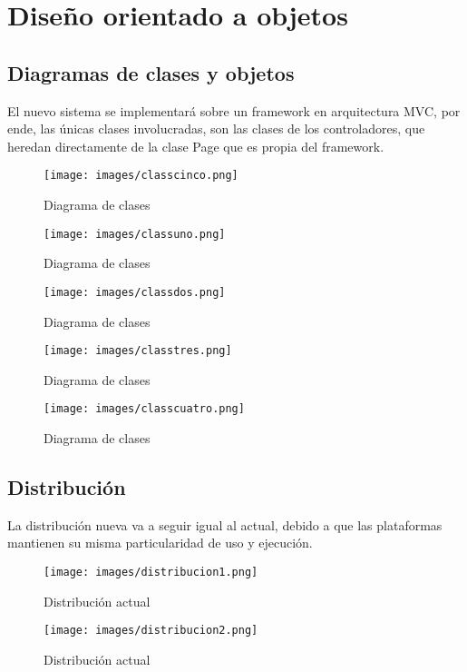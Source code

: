 \chapter{Dise\~no orientado a objetos}
\section{Diagramas de clases y objetos}
El nuevo sistema se implementar\'a sobre un framework en arquitectura MVC, por ende, las \'unicas clases involucradas, son las clases de los controladores, que heredan directamente de la clase Page que es propia del framework.%
%
\begin{figure}[htbp]
	\centering
		\texttt{[image: images/classcinco.png]}
	\caption{Diagrama de clases}
	\label{fig:classcinco}
\end{figure}%
%
\begin{figure}[htbp]
	\centering
		\texttt{[image: images/classuno.png]}
	\caption{Diagrama de clases}
	\label{fig:classuno}
\end{figure}%
%
\begin{figure}[htbp]
	\centering
		\texttt{[image: images/classdos.png]}
	\caption{Diagrama de clases}
	\label{fig:classdos}
\end{figure}%
%
\begin{figure}[htbp]
	\centering
		\texttt{[image: images/classtres.png]}
	\caption{Diagrama de clases}
	\label{fig:classtres}
\end{figure}%
%
\begin{figure}[htbp]
	\centering
		\texttt{[image: images/classcuatro.png]}
	\caption{Diagrama de clases}
	\label{fig:classcuatro}
\end{figure}%
\newpage%
\section{Distribuci\'on}
La distribuci\'on nueva va a seguir igual al actual, debido a que las plataformas mantienen su misma particularidad de uso y ejecuci\'on.%
\begin{figure}[htbp]
	\centering
		\texttt{[image: images/distribucion1.png]}
	\caption{Distribuci\'on actual}
	\label{fig:distribucion11}
\end{figure}%
%
\begin{figure}[htbp]
	\centering
		\texttt{[image: images/distribucion2.png]}
	\caption{Distribuci\'on actual}
	\label{fig:distribucion21}
\end{figure}%
\\%
%
\newpage%
